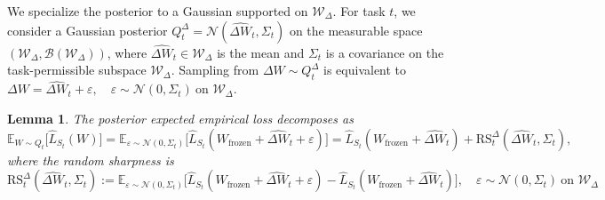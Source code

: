 \documentclass{article}
\theoremstyle{plain}
\newtheorem{lemma}[theorem]{Lemma}
\theoremstyle{definition}
\theoremstyle{remark}
\begin{document}
We specialize the posterior to a Gaussian supported on $\mathcal W_\Delta$. For task $t$, we consider a Gaussian posterior \( Q_t^{\Delta} = \mathcal{N}(\hat{\Delta W}_t, \Sigma_t) \) on the measurable space \( (\mathcal{W}_\Delta, \mathcal{B}(\mathcal{W}_\Delta)) \), where \( \hat{\Delta W}_t \in \mathcal{W}_\Delta \) is the mean and \( \Sigma_t\) is a covariance on the task-permissible subspace \( \mathcal{W}_\Delta \). Sampling from \( \Delta W \sim Q_t^{\Delta} \) is equivalent to 
$
\Delta W = \hat{\Delta W}_t + \varepsilon, \quad \varepsilon \sim \mathcal{N}(0, \Sigma_t) \ \text{on } \mathcal{W}_\Delta.
$ 

\begin{lemma}
    The posterior expected empirical loss decomposes as
\begin{equation*}
    \mathbb{E}_{W\sim Q_t}\big[\hat{L}_{S_t}(W)\big]
= \mathbb{E}_{\varepsilon\sim\mathcal N(0,\Sigma_t)}
    \big[\hat{L}_{S_t}(W_\mathrm {frozen }+\hat{\Delta W}_t+\varepsilon)\big]
= \hat{L}_{S_t}(W_\mathrm {frozen }+\hat{\Delta W}_t)
  + \mathrm{RS}_t^{\Delta}(\hat{\Delta W}_t,\Sigma_t),
\end{equation*}
where the random sharpness is
$$
\mathrm{RS}_t^{\Delta}(\hat{\Delta W}_t,\Sigma_t)
:= \mathbb{E}_{\varepsilon\sim\mathcal N(0,\Sigma_t)}
   \big[\hat{L}_{S_t}(W_\mathrm {frozen }+\hat{\Delta W}_t+\varepsilon)
       - \hat{L}_{S_t}(W_\mathrm {frozen }+\hat{\Delta W}_t)\big],\quad
\varepsilon\sim\mathcal N(0,\Sigma_t)\ \text{on } \mathcal W_\Delta$$
\end{lemma}
\end{document}
